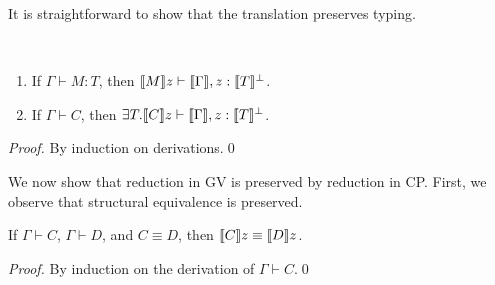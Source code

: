 \documentclass[oribibl,orivec,envcountsame]{llncs}
\begin{document}


It is straightforward to show that the translation preserves typing.
\begin{theorem}
~
\begin{enumerate}
\item If $\Gamma \vdash M : T$, then $\llbracket M \rrbracket z \vdash \llbracket \Gamma \rrbracket, z:\llbracket T \rrbracket^\perp$.
\item If $\Gamma \vdash C$, then $\exists T. \llbracket C \rrbracket z \vdash \llbracket \Gamma \rrbracket, z:\llbracket T \rrbracket^\perp$.
\end{enumerate}
\end{theorem}
\begin{proof}
By induction on derivations.\qed
\end{proof}

We now show that reduction in GV is preserved by reduction in CP. First, we observe that structural
equivalence is preserved.
%
\begin{theorem}
If $\Gamma \vdash C$, $\Gamma \vdash D$, and $C \equiv D$, then $\llbracket C \rrbracket z \equiv \llbracket D \rrbracket z$.
\end{theorem}
%
\begin{proof}
By induction on the derivation of $\Gamma \vdash C$.\qed
\end{proof}
\end{document}
